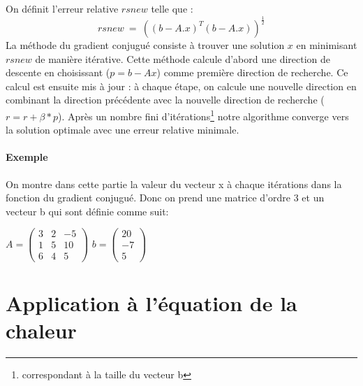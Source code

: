 \documentclass{article}
\begin{document}
On définit l'erreur relative $rsnew$ telle que :
\begin{equation*}
  rsnew~=~((b-A.x)^{T}(b-A.x))^{\frac{1}{2}}
\end{equation*}
La méthode du gradient conjugué consiste à trouver une solution $x$ en minimisant
$rsnew$ de manière itérative. 
Cette méthode calcule d'abord une direction de descente en choisissant  ($p=b-Ax$) comme 
première direction de recherche. Ce calcul est ensuite mis à jour : à chaque étape, on calcule une nouvelle 
direction en combinant la direction précédente avec la nouvelle direction de 
recherche ($r=r+\beta*p$). Après un nombre fini d'itérations\footnote{correspondant à la taille du vecteur b}
notre algorithme converge vers la solution optimale avec une erreur relative minimale.


\paragraph{Exemple}
On montre dans cette partie la valeur du vecteur x à chaque itérations dans la fonction
du gradient conjugué. Donc on prend une matrice d'ordre 3 et un vecteur b qui sont définie comme suit:

$A=
\begin{pmatrix}
  3&2&-5 \\ 1&5&10 \\ 6&4&5
\end{pmatrix}
$
$b=
\begin{pmatrix}
  20 
  \\ -7 \\
    5
\end{pmatrix}
$


\section{Application à l'équation de la chaleur}
\end{document}
